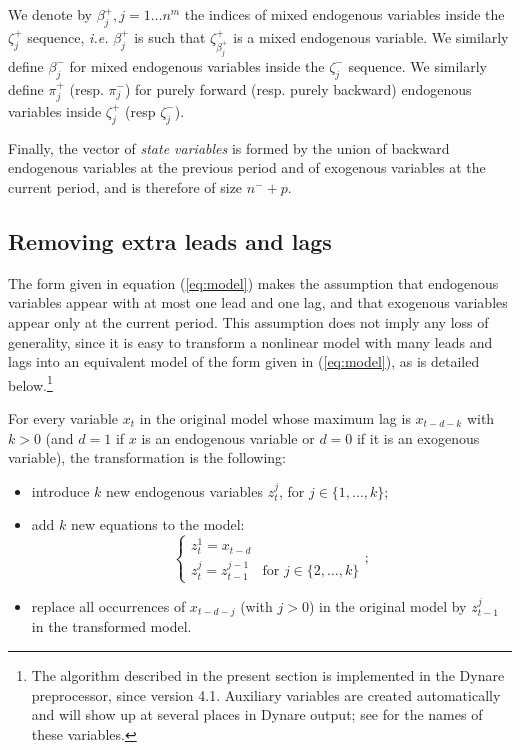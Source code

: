 \documentclass[11pt,a4paper]{article}
\begin{document}
We denote by $\beta^+_j, j=1\ldots n^m$ the indices of mixed endogenous
variables inside the $\zeta^+_j$ sequence, \textit{i.e.} $\beta^+_j$ is such
that $\zeta^+_{\beta^+_j}$ is a mixed endogenous variable. We similarly define
$\beta^-_j$ for mixed endogenous variables inside the $\zeta^-_j$ sequence. We
similarly define $\pi^+_j$ (resp. $\pi^-_j$) for purely forward (resp. purely
backward) endogenous variables inside $\zeta^+_j$ (resp $\zeta^-_j$).

Finally, the vector of \emph{state variables} is formed by the union of
backward endogenous variables at the previous period and of exogenous variables
at the current period, and is therefore of size $n^-+p$.

\subsection{Removing extra leads and lags}

The form given in equation (\ref{eq:model}) makes the assumption that
endogenous variables appear with at most one lead and one lag, and
that exogenous variables appear only at the current period. This
assumption does not imply any loss of generality, since it is easy to
transform a nonlinear model with many leads and lags into an
equivalent model of the form given in (\ref{eq:model}), as is detailed
below.\footnote{The algorithm described in the present section is
  implemented in the Dynare preprocessor, since version 4.1. Auxiliary
  variables are created automatically and will show up at several
  places in Dynare output; see \citet{adjemian/al:2011} for the names
  of these variables.}

For every variable $x_t$ in the original model whose maximum lag is $x_{t-d-k}$
with $k>0$ (and $d=1$ if $x$ is an endogenous variable or $d=0$ if it is an
exogenous variable), the transformation is the following:
\begin{itemize}
\item introduce $k$ new endogenous variables $z^j_t$, for
  $j\in\{1,\ldots,k\}$;
\item add $k$ new equations to the model:
  \begin{equation*}
    \left\{\begin{array}{ll}
        z^1_t = x_{t-d} & \\
        z^j_t = z^{j-1}_{t-1} & \text{for } j\in\{2, \ldots,k\}
      \end{array}\right.;
  \end{equation*}
\item replace all occurrences of $x_{t-d-j}$ (with $j>0$) in the original model
  by $z^j_{t-1}$ in the transformed model.
\end{itemize}
\end{document}
